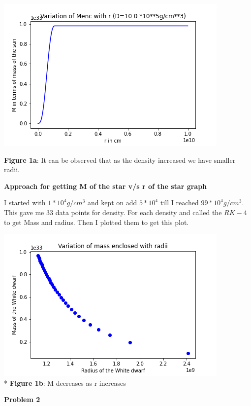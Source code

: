 \documentclass{article}
\begin{document}
\begin{center}
\begin{multicols}{2}
\begin{center}
        \end{center}
\columnbreak
       \includegraphics[scale=0.3]{Images/Mr_pb1_4}
\end{multicols}
\textbf{Figure 1a}: It can be observed that as the density increased we have smaller radii.
\end{center}
\vspace{0.2em}
  \clearpage
\textbf{Approach for getting M of the star v/s r of the star graph}

I started with $1*10^{4}g/cm^{3}$ and kept on add $5*10^{4}$ till I reached $99*10^{4}g/cm^{3}$. This gave me 33 data points for density. For each density and called the $RK-4$ to get Mass and radius. Then I plotted them to get this plot.

\begin{center}
\includegraphics[scale=0.5]{Images/Mr_pb1h}
\\*
\textbf{Figure 1b}: M decreases as r increases
\end{center}

\clearpage
\vspace{1.5em}
\textbf{Problem 2}\vspace{1.5em}
\end{document}

